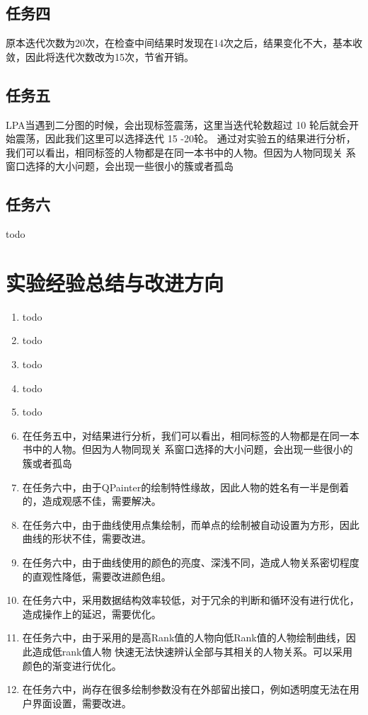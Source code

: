 \documentclass[a4paper,UTF8]{article}
\numberwithin{equation}{section}
\begin{document}
\subsection{任务四}
原本迭代次数为20次，在检查中间结果时发现在14次之后，结果变化不大，基本收敛，因此将迭代次数改为15次，节省开销。
\subsection{任务五}
LPA当遇到二分图的时候，会出现标签震荡，这里当迭代轮数超过 10 轮后就会开始震荡，因此我们这里可以选择迭代 15 -20轮。
通过对实验五的结果进行分析，我们可以看出，相同标签的人物都是在同一本书中的人物。但因为人物同现关
系窗口选择的大小问题，会出现一些很小的簇或者孤岛
\subsection{任务六}
todo
\section{实验经验总结与改进方向}
\begin{enumerate}[1)]
    \item todo
    \item todo
    \item todo
    \item todo
    \item todo
    \item 在任务五中，对结果进行分析，我们可以看出，相同标签的人物都是在同一本书中的人物。但因为人物同现关
系窗口选择的大小问题，会出现一些很小的簇或者孤岛
    \item 在任务六中，由于QPainter的绘制特性缘故，因此人物的姓名有一半是倒着的，造成观感不佳，需要解决。
    \item 在任务六中，由于曲线使用点集绘制，而单点的绘制被自动设置为方形，因此曲线的形状不佳，需要改进。
    \item 在任务六中，由于曲线使用的颜色的亮度、深浅不同，造成人物关系密切程度的直观性降低，需要改进颜色组。
    \item 在任务六中，采用数据结构效率较低，对于冗余的判断和循环没有进行优化，造成操作上的延迟，需要优化。
    \item 在任务六中，由于采用的是高Rank值的人物向低Rank值的人物绘制曲线，因此造成低rank值人物
    快速无法快速辨认全部与其相关的人物关系。可以采用颜色的渐变进行优化。
    \item 在任务六中，尚存在很多绘制参数没有在外部留出接口，例如透明度无法在用户界面设置，需要改进。
\end{enumerate}


\end{document}

